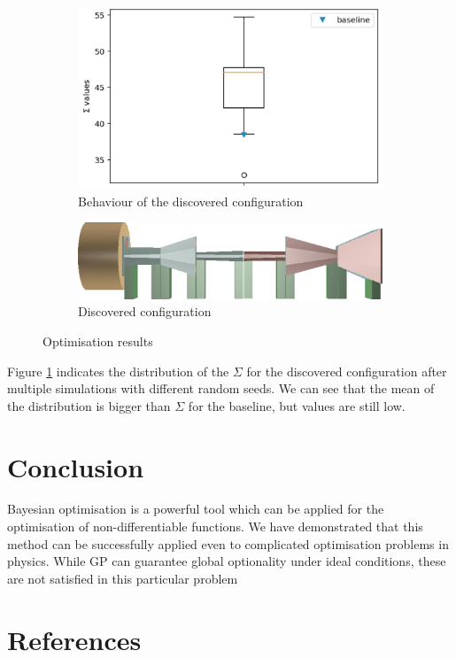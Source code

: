 \documentclass[a4paper]{jpconf}
\theoremstyle{my_theorem_style}
\numberwithin{equation}{section}
\begin{document}
\begin{figure}[H]
\centering
\begin{subfigure}{.5\textwidth}
  \centering
  \includegraphics[width=.7\linewidth]{pics/solution}
  \caption{Behaviour of the discovered configuration}
  \label{fig:sub1}
\end{subfigure}%
\begin{subfigure}{.5\textwidth}
  \centering
  \includegraphics[width=.7\linewidth]{pics/sol_2.png}
  \caption{Discovered configuration}
  \label{fig:sub2}
\end{subfigure}
\caption{Optimisation results}
\label{fig:sub2}
\end{figure}

Figure \ref{fig:sub1} indicates the distribution of the $\Sigma$ for the discovered configuration after multiple simulations with different random seeds. We can see that the mean of the distribution is bigger than $\Sigma$ for the baseline, but values are still low.

\section{Conclusion}

Bayesian optimisation is a powerful tool which can be applied for the optimisation of non-differentiable functions. We have demonstrated that this method can be successfully applied even to complicated optimisation problems in physics. While GP can guarantee global optionality under ideal conditions, these are not satisfied in this particular problem

\ack

\section*{References}
\end{document}

